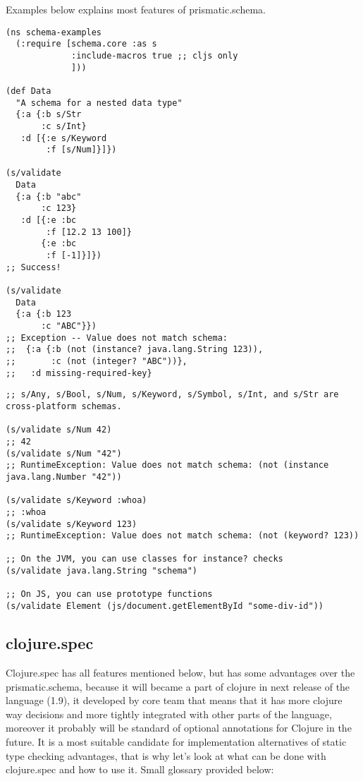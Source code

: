 Examples below explains most features of prismatic.schema.

\begin{verbatim}
(ns schema-examples
  (:require [schema.core :as s
             :include-macros true ;; cljs only
             ]))

(def Data
  "A schema for a nested data type"
  {:a {:b s/Str
       :c s/Int}
   :d [{:e s/Keyword
        :f [s/Num]}]})

(s/validate
  Data
  {:a {:b "abc"
       :c 123}
   :d [{:e :bc
        :f [12.2 13 100]}
       {:e :bc
        :f [-1]}]})
;; Success!

(s/validate
  Data
  {:a {:b 123
       :c "ABC"}})
;; Exception -- Value does not match schema:
;;  {:a {:b (not (instance? java.lang.String 123)),
;;       :c (not (integer? "ABC"))},
;;   :d missing-required-key}
\end{verbatim}

\begin{verbatim}
;; s/Any, s/Bool, s/Num, s/Keyword, s/Symbol, s/Int, and s/Str are cross-platform schemas.

(s/validate s/Num 42)
;; 42
(s/validate s/Num "42")
;; RuntimeException: Value does not match schema: (not (instance java.lang.Number "42"))

(s/validate s/Keyword :whoa)
;; :whoa
(s/validate s/Keyword 123)
;; RuntimeException: Value does not match schema: (not (keyword? 123))

;; On the JVM, you can use classes for instance? checks
(s/validate java.lang.String "schema")

;; On JS, you can use prototype functions
(s/validate Element (js/document.getElementById "some-div-id"))
\end{verbatim}


\subsection{clojure.spec}


Clojure.spec has all features mentioned below, but has some advantages over the
prismatic.schema, because it will became a part of clojure in next release of
the language (1.9), it developed by core team that means that it has more
clojure way decisions and more tightly integrated with other parts of the
language, moreover it probably will be standard of optional annotations for
Clojure in the future. It is a most suitable candidate for implementation
alternatives of static type checking advantages, that is why let's look at what
can be done with clojure.spec and how to use it. Small glossary provided below:


